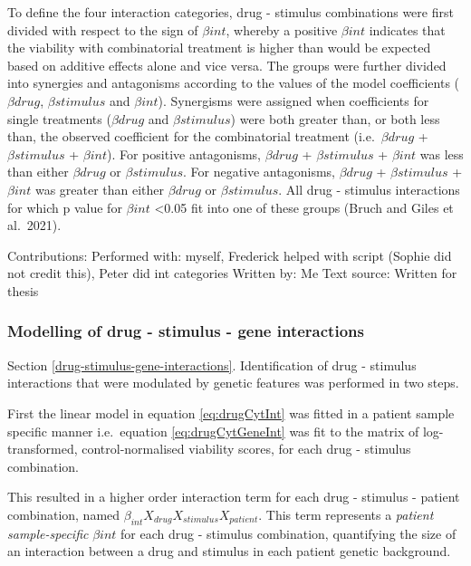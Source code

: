 \documentclass[11pt, a4paper, twosided]{book}
\begin{document}
To define the four interaction categories, drug - stimulus combinations were first divided with respect to the sign of \(\beta{int}\), whereby a positive \(\beta{int}\) indicates that the viability with combinatorial treatment is higher than would be expected based on additive effects alone and vice versa. The groups were further divided into synergies and antagonisms according to the values of the model coefficients (\(\beta{drug}\), \(\beta{stimulus}\) and \(\beta{int}\)). Synergisms were assigned when coefficients for single treatments (\(\beta{drug}\) and \(\beta{stimulus}\)) were both greater than, or both less than, the observed coefficient for the combinatorial treatment (i.e.~\(\beta{drug}\) + \(\beta{stimulus}\) + \(\beta{int}\)). For positive antagonisms, \(\beta{drug}\) + \(\beta{stimulus}\) + \(\beta{int}\) was less than either \(\beta{drug}\) or \(\beta{stimulus}\). For negative antagonisms, \(\beta{drug}\) + \(\beta{stimulus}\) + \(\beta{int}\) was greater than either \(\beta{drug}\) or \(\beta{stimulus}\). All drug - stimulus interactions for which p value for \(\beta{int}\) \textless0.05 fit into one of these groups (Bruch and Giles et al.~2021).

Contributions:
Performed with: myself, Frederick helped with script (Sophie did not credit this), Peter did int categories
Written by: Me
Text source: Written for thesis

\hypertarget{drug-stimulus-gene-interactions-method}{%
\subsubsection{Modelling of drug - stimulus - gene interactions}\label{drug-stimulus-gene-interactions-method}}

Section \ref{drug-stimulus-gene-interactions}. Identification of drug - stimulus interactions that were modulated by genetic features was performed in two steps.

First the linear model in equation \eqref{eq:drugCytInt} was fitted in a patient sample specific manner i.e.~equation \eqref{eq:drugCytGeneInt} was fit to the matrix of log-transformed, control-normalised viability scores, for each drug - stimulus combination.

This resulted in a higher order interaction term for each drug - stimulus - patient combination, named \(\beta_{int}X_{drug}X_{stimulus}X_{patient}\). This term represents a \emph{patient sample-specific} \(\beta{int}\) for each drug - stimulus combination, quantifying the size of an interaction between a drug and stimulus in each patient genetic background.
\end{document}
